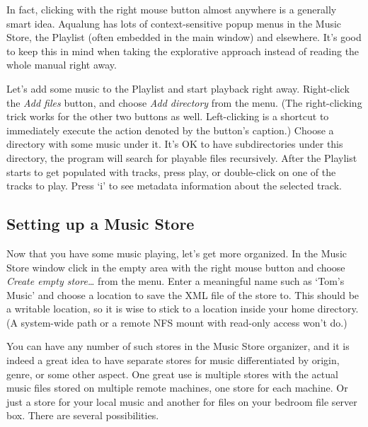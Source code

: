 \documentclass[10pt,english]{article}
\begin{document}
In fact, clicking with the right mouse button almost
anywhere is a generally smart idea. Aqualung has lots of
context-sensitive popup menus in the Music Store, the Playlist
(often embedded in the main window) and elsewhere. It's good
to keep this in mind when taking the explorative approach
instead of reading the whole manual right away.




Let's add some music to the Playlist and start playback
right away. Right-click the \textsl{Add files} button, and
choose \textsl{Add directory} from the menu. (The
right-clicking trick works for the other two buttons as
well. Left-clicking is a shortcut to immediately execute the
action denoted by the button's caption.) Choose a directory
with some music under it. It's OK to have subdirectories under
this directory, the program will search for playable files
recursively. After the Playlist starts to get populated with
tracks, press play, or double-click on one of the tracks to
play. Press `i' to see metadata information about the
selected track.




\subsection{Setting up a Music Store\label{idp335856}}



\noindent Now that you have some music playing, let's get more
organized. In the Music Store window click in the empty area
with the right mouse button and choose \textsl{Create empty
store\dots{}} from the menu. Enter a meaningful name such as
`Tom's Music' and choose a location to save the XML file
of the store to. This should be a writable location, so it is
wise to stick to a location inside your home directory. (A
system-wide path or a remote NFS mount with read-only access
won't do.)




You can have any number of such stores in the Music Store
organizer, and it is indeed a great idea to have separate
stores for music differentiated by origin, genre, or some
other aspect. One great use is multiple stores with the actual
music files stored on multiple remote machines, one store for
each machine. Or just a store for your local music and another
for files on your bedroom file server box. There are several
possibilities.
\end{document}
